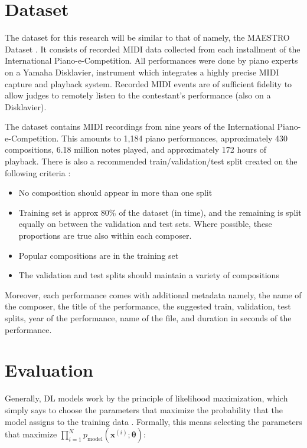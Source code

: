 \section{Dataset}

The dataset for this research will be similar to that of \parencite{oore_this_2018} namely, the MAESTRO Dataset \parencite{hawthorne_enabling_2018}. It consists of recorded MIDI data collected from each installment of the International Piano-e-Competition. All performances were done by piano experts on a Yamaha Disklavier, instrument which integrates a highly precise MIDI capture and playback system. Recorded MIDI events are of sufficient fidelity to allow judges to remotely listen to the contestant's performance (also on a Disklavier).

The dataset contains MIDI recordings from nine years of the International Piano-e-Competition. This amounts to 1,184 piano performances, approximately 430 compositions, 6.18 million notes played, and approximately 172 hours of playback. There is also a recommended train/validation/test split created on the following criteria \parencite{hawthorne_enabling_2018}:

\begin{itemize}
    \item No composition should appear in more than one split
    \item Training set is approx 80\% of the dataset (in time), and the remaining is split equally on between the validation and test sets. Where possible, these proportions are true also within each composer.
    \item Popular compositions are in the training set
    \item The validation and test splits should maintain a variety of compositions
\end{itemize}

Moreover, each performance comes with additional metadata namely, the name of the composer, the title of the performance, the suggested train, validation, test splits, year of the performance, name of the file, and duration in seconds of the performance.

\section{Evaluation}

Generally, DL models work by the principle of likelihood maximization, which simply says to choose the parameters that maximize the probability that the model assigns to the training data \parencite{goodfellow_nips_2016}. Formally, this means selecting the parameters that maximize $\prod_{i=1}^N p_{\text{model}}(\bm{x}^{(i)}; \bm{\theta})$:

